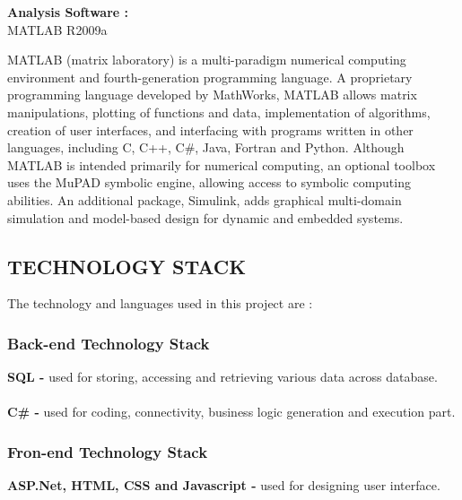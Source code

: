 \documentclass[14pt]{article} %
\begin{document}
\textbf{Analysis Software :}\\
\indent MATLAB R2009a\\ \par
MATLAB (matrix laboratory) is a multi-paradigm numerical computing environment and fourth-generation programming language. A proprietary programming language developed by MathWorks, MATLAB allows matrix manipulations, plotting of functions and data, implementation of algorithms, creation of user interfaces, and interfacing with programs written in other languages, including C, C++, C\#, Java, Fortran and Python.
Although MATLAB is intended primarily for numerical computing, an optional toolbox uses the MuPAD symbolic engine, allowing access to symbolic computing abilities. An additional package, Simulink, adds graphical multi-domain simulation and model-based design for dynamic and embedded systems.

 
 \subsection{TECHNOLOGY STACK}
\noindent The technology and languages used in this project are :
\subsubsection{Back-end Technology Stack}
\indent \textbf{SQL - } used for storing, accessing and retrieving various data across database.\\
\\ \indent \textbf{C\# - } used for coding, connectivity, business logic generation and execution part.
\subsubsection{Fron-end Technology Stack}
\indent \textbf{ASP.Net, HTML, CSS and Javascript - } used for designing user interface. 
\end{document}

